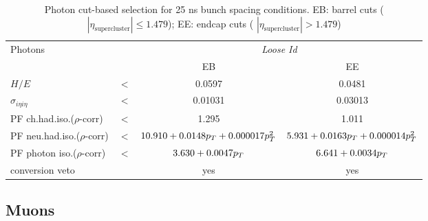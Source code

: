  \begin{table}[htb]
  \centering
  \caption{Photon cut-based selection for 25 ns bunch spacing conditions. EB: barrel cuts ( $|\eta_\text{supercluster}| \leq 1.479$); EE: endcap cuts ( $|\eta_\text{supercluster}| > 1.479$)}\label{tab:PhotonId}
     \begin{tabular}{l|ccc}
     Photons                                   &       & \multicolumn{2}{c}{\emph{Loose Id}}\\
                                               &       & EB      & EE  \\
  \hline
  \hline
     $H/E $                                    & $ < $ &0.0597   & 0.0481      \\
     $\sigma_{i\eta i\eta} $                   & $ < $ &0.01031  & 0.03013   \\
     PF ch.had.iso.($\rho$-corr)               & $ < $ &1.295    & 1.011   \\
     PF neu.had.iso.($\rho$-corr)              & $ < $ &$10.910+0.0148p_T+0.000017p_T^2$    &$5.931+0.0163p_T+0.000014p_T^2 $   \\
     PF photon iso.($\rho$-corr)               & $ < $ &$3.630+0.0047p_T$                 &$6.641+0.0034p_T $   \\
     conversion veto                           &       & yes     &yes     \\
 \end{tabular}

 \end{table}


\subsection{Muons}\label{ssec:muons}


